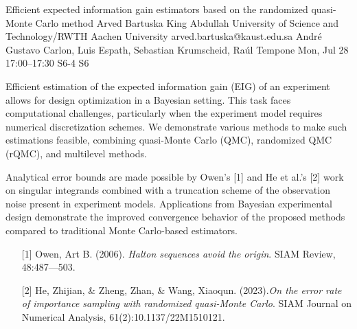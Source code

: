 \begin{talk}
  {Efficient expected information gain estimators based on the randomized quasi-Monte Carlo method}%
  {Arved Bartuska}%
  {King Abdullah University of Science and Technology/RWTH Aachen University}%
  {arved.bartuska@kaust.edu.sa}%
  {Andr\'{e} Gustavo Carlon, Luis Espath, Sebastian Krumscheid, Ra\'{u}l Tempone}%
  {}%
  {Mon, Jul 28 17:00–17:30}%
  {S6-4}%
  {S6}%
  
				
			
Efficient estimation of the expected information gain (EIG) of an experiment allows for design optimization in a Bayesian setting. This task faces computational challenges, particularly when the experiment model requires numerical discretization schemes. We demonstrate various methods to make such estimations feasible, combining quasi-Monte Carlo (QMC), randomized QMC (rQMC), and multilevel methods.

Analytical error bounds are made possible by Owen's [1] and He et al.'s [2] work on singular integrands combined with a truncation scheme of the observation noise present in experiment models. Applications from Bayesian experimental design demonstrate the improved convergence behavior of the proposed methods compared to traditional Monte Carlo-based estimators.

\medskip

\begin{enumerate}
	\item[{[1]}] Owen, Art B. (2006). {\it Halton sequences avoid the origin}. SIAM Review, 48:487---503.
	\item[{[2]}] He, Zhijian, \& Zheng, Zhan, \& Wang, Xiaoqun. (2023).{\it On the error rate of importance sampling with randomized quasi-Monte Carlo}. SIAM Journal
on Numerical Analysis,  61(2):10.1137/22M1510121.
\end{enumerate}

\end{talk}

